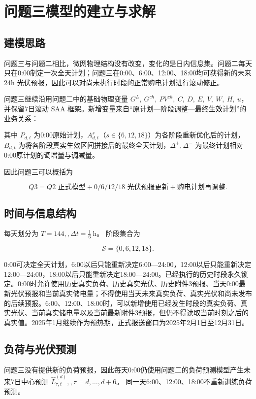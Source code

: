 \section{问题三模型的建立与求解}

\subsection{建模思路}

问题三与问题二相比，微网物理结构没有改变，变化的是日内信息集。问题二每天只在0:00制定一次全天计划；问题三在0:00、6:00、12:00、18:00均可获得新的未来24h 光伏预报，因此可以对尚未执行时段的正常购电计划进行滚动修正。

问题三继续沿用问题二中的基础物理变量 \(G^L,\ G^{ch},\ PV^{ch},\ C,\ D,\ E,\ V,\ W,\ H,\ u\)， 并保留7日滚动 SAA 框架。新增变量来自“原计划—阶段调整—最终生效计划”的业务关系：

\noindent 其中 \(P_{d,t}\) 为0:00原始计划，\(A^s_{d,t}\)（\(s\in\{6,12,18\}\)）为各阶段重新优化后的计划，\(B_{d,t}\) 为将各阶段真实生效区间拼接后的最终全天计划，\(\Delta^+,\Delta^-\) 为最终计划相对0:00原计划的调增量与调减量。

因此问题三可以概括为

\[
\boxed{
Q3
=
Q2\text{ 正式模型}
+
0/6/12/18\text{ 光伏预报更新}
+
\text{购电计划再调整}
}.
\]

\subsection{时间与信息结构}

每天划分为 \(T=144,, \Delta t=\frac16\ \mathrm{h}\)。 阶段集合为

\[
\mathcal S=\{0,6,12,18\}.
\]

0:00可决定全天计划，6:00以后只能重新决定6:00—24:00，12:00以后只能重新决定12:00—24:00，18:00以后只能重新决定18:00—24:00。已经执行的历史时段永久锁定。0:00时允许使用历史真实负荷、历史真实光伏、历史附件3预报、当天0:00最新光伏预报和当前真实储电量；不得使用当天未来真实负荷、真实光伏和尚未发布的后续预报。6:00、12:00、18:00时，可以新增使用已经发生时段的真实负荷、真实光伏、当前真实储电量以及当前最新附件3预报，但仍不得读取当前时刻之后的真实值。2025年1月继续作为预热期，正式报送窗口为2025年2月1日至12月31日。

\subsection{负荷与光伏预测}

问题三没有提供新的负荷预报，因此每天0:00仍使用问题二的负荷预测模型产生未来7日中心预测 \(\hat L_{\tau,t}^{(d)},, \tau=d,\ldots,d+6\)。 同一天6:00、12:00、18:00不重新训练负荷预测。

